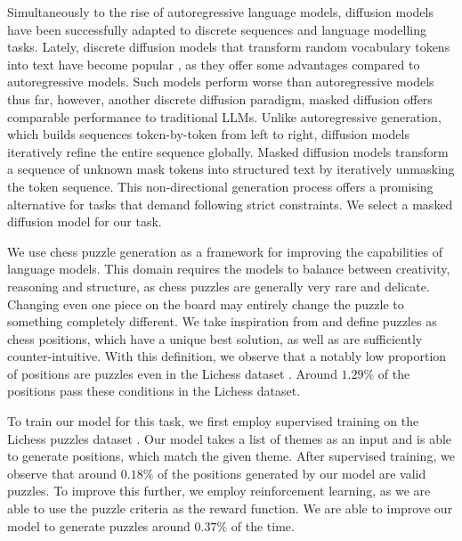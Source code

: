 Simultaneously to the rise of autoregressive language models, diffusion models have been successfully adapted to discrete sequences and language modelling tasks. Lately, discrete diffusion models that transform random vocabulary tokens into text have become popular \cite{diffusiongemma}, as they offer some advantages compared to autoregressive models. Such models perform worse than autoregressive models thus far, however, another discrete diffusion paradigm, masked diffusion \cite{austin2021structureddenoisingdiffusionmodels,nie2025largelanguagediffusionmodels} offers comparable performance to traditional LLMs. Unlike autoregressive generation, which builds sequences token-by-token from left to right, diffusion models iteratively refine the entire sequence globally. Masked diffusion models transform a sequence of unknown mask tokens into structured text by iteratively unmasking the token sequence. This non-directional generation process offers a promising alternative for tasks that demand following strict constraints. We select a masked diffusion model for our task.

We use chess puzzle generation as a framework for improving the capabilities of language models. This domain requires the models to balance between creativity, reasoning and structure, as chess puzzles are generally very rare and delicate. Changing even one piece on the board may entirely change the puzzle to something completely different. We take inspiration from \citeauthor{feng2025generatingcreativechesspuzzles} \cite{feng2025generatingcreativechesspuzzles} and define puzzles as chess positions, which have a unique best solution, as well as are sufficiently counter-intuitive. With this definition, we observe that a notably low proportion of positions are puzzles even in the Lichess dataset \cite{lichesspuzzledatabase}. Around $1.29\%$ of the positions pass these conditions in the Lichess dataset.

To train our model for this task, we first employ supervised training on the Lichess puzzles dataset \cite{lichesspuzzledatabase}. Our model takes a list of themes as an input and is able to generate positions, which match the given theme. After supervised training, we observe that around $0.18\%$ of the positions generated by our model are valid puzzles. To improve this further, we employ reinforcement learning, as we are able to use the puzzle criteria as the reward function. We are able to improve our model to generate puzzles around $0.37\%$ of the time.


